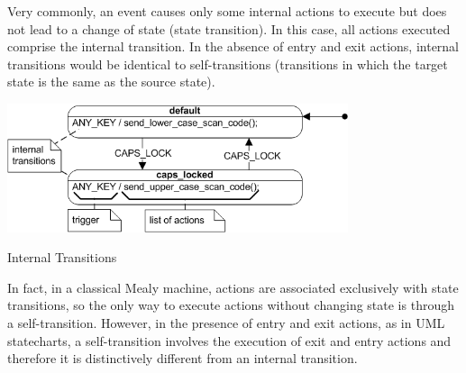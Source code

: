 Very commonly, an event causes only some internal actions to execute but does not lead to a change of state (state transition). In this case, all actions executed comprise the internal transition. In the absence of entry and exit actions, internal transitions would be identical to self-\/transitions (transitions in which the target state is the same as the source state).

 
\begin{DoxyImage}
\includegraphics[width=10cm]{internal_transition.png}
\caption{Internal Transitions}
\end{DoxyImage}


In fact, in a classical Mealy machine, actions are associated exclusively with state transitions, so the only way to execute actions without changing state is through a self-\/transition. However, in the presence of entry and exit actions, as in U\+ML statecharts, a self-\/transition involves the execution of exit and entry actions and therefore it is distinctively different from an internal transition. 